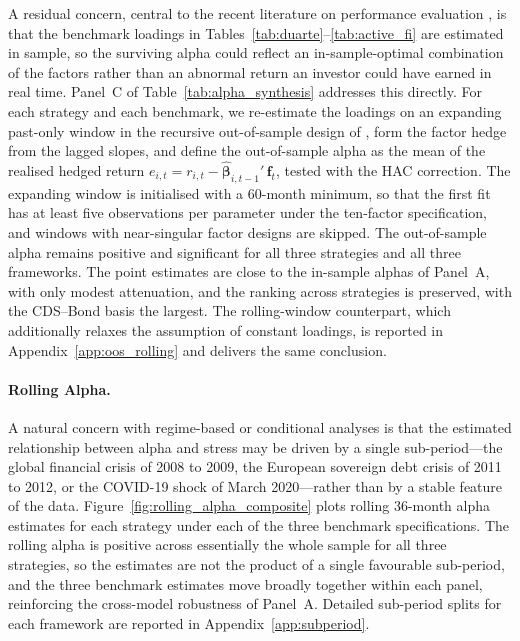 A residual concern, central to the recent literature on performance
evaluation \citep{moreira2017volatility, cederburg2020performance}, is
that the benchmark loadings in
Tables~\ref{tab:duarte}--\ref{tab:active_fi} are estimated in sample,
so the surviving alpha could reflect an in-sample-optimal combination
of the factors rather than an abnormal return an investor could have
earned in real time. Panel~C of Table~\ref{tab:alpha_synthesis}
addresses this directly. For each strategy and each benchmark, we
re-estimate the loadings on an expanding past-only window in the
recursive out-of-sample design of \citet{welch2008comprehensive}, form
the factor hedge from the lagged slopes, and define the out-of-sample
alpha as the mean of the realised hedged return
$e_{i,t} = r_{i,t} - \hat{\boldsymbol{\beta}}_{i,t-1}'\,\mathbf{f}_t$,
tested with the \citet{newey1994automatic} HAC correction. The
expanding window is initialised with a 60-month minimum, so that the
first fit has at least five observations per parameter under the
ten-factor \citet{duarte2007risk} specification, and windows with
near-singular factor designs are skipped. The out-of-sample alpha
remains positive and significant for all three strategies and all
three frameworks. The point estimates are close to the in-sample
alphas of Panel~A, with only modest attenuation, and the ranking
across strategies is preserved, with the CDS--Bond basis the
largest. The rolling-window counterpart, which additionally relaxes
the assumption of constant loadings, is reported in
Appendix~\ref{app:oos_rolling} and delivers the same conclusion.

\paragraph{Rolling Alpha.}

A natural concern with regime-based or conditional analyses is that
the estimated relationship between alpha and stress may be driven by a
single sub-period---the global financial crisis of 2008 to 2009, the
European sovereign debt crisis of 2011 to 2012, or the COVID-19 shock
of March 2020---rather than by a stable feature of the data.
Figure~\ref{fig:rolling_alpha_composite} plots rolling 36-month alpha
estimates for each strategy under each of the three benchmark
specifications. The rolling alpha is positive across essentially the
whole sample for all three strategies, so the estimates are not the
product of a single favourable sub-period, and the three benchmark
estimates move broadly together within each panel, reinforcing the
cross-model robustness of Panel~A. Detailed sub-period splits for each
framework are reported in Appendix~\ref{app:subperiod}.

